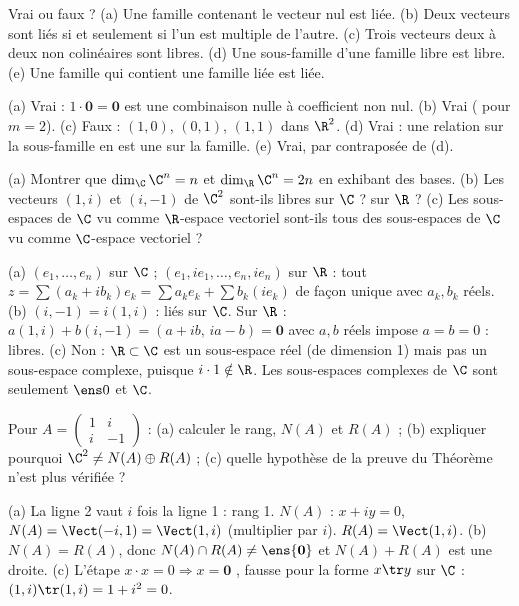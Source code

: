 \begin{exo}
Vrai ou faux ? (a) Une famille contenant le vecteur nul est liée. (b) Deux vecteurs sont liés si et seulement si l'un est multiple de l'autre. (c) Trois vecteurs deux à deux non colinéaires sont libres. (d) Une sous-famille d'une famille libre est libre. (e) Une famille qui contient une famille liée est liée.
\begin{corrige}
(a) Vrai : $1\cdot\mathbf 0=\mathbf 0$ est une combinaison nulle à coefficient non nul. (b) Vrai ( pour $m=2$). (c) Faux : $(1,0)$, $(0,1)$, $(1,1)$ dans $\R^2$. (d) Vrai : une relation sur la sous-famille en est une sur la famille. (e) Vrai, par contraposée de (d).
\end{corrige}
\end{exo}
\begin{exo}
(a) Montrer que $\dim_{\C}\C^n=n$ et $\dim_{\R}\C^n=2n$ en exhibant des bases. (b) Les vecteurs $(1,i)$ et $(i,-1)$ de $\C^2$ sont-ils libres sur $\C$ ? sur $\R$ ? (c) Les sous-espaces de $\C$ vu comme $\R$-espace vectoriel sont-ils tous des sous-espaces de $\C$ vu comme $\C$-espace vectoriel ?
\begin{corrige}
(a) $(e_1,\dots,e_n)$ sur $\C$ ; $(e_1,ie_1,\dots,e_n,ie_n)$ sur $\R$ : tout $z=\sum(a_k+ib_k)e_k=\sum a_ke_k+\sum b_k(ie_k)$ de façon unique avec $a_k,b_k$ réels. (b) $(i,-1)=i(1,i)$ : liés sur $\C$. Sur $\R$ : $a(1,i)+b(i,-1)=(a+ib,\,ia-b)=\mathbf 0$ avec $a,b$ réels impose $a=b=0$ : libres. (c) Non : $\R\subset\C$ est un sous-espace réel (de dimension 1) mais pas un sous-espace complexe, puisque $i\cdot1\notin\R$. Les sous-espaces complexes de $\C$ sont seulement $\ens0$ et $\C$.
\end{corrige}
\end{exo}
\begin{exo}
Pour $A=\begin{pmatrix}1&i\\i&-1\end{pmatrix}$ : (a) calculer le rang, $N(A)$ et $R(A)$ ; (b) expliquer pourquoi $\C^2\neq N(A)\oplus R(A)$ ; (c) quelle hypothèse de la preuve du Théorème  n'est plus vérifiée ?
\begin{corrige}
(a) La ligne 2 vaut $i$ fois la ligne 1 : rang 1. $N(A)$ : $x+iy=0$, $N(A)=\Vect(-i,1)=\Vect(1,i)$ (multiplier par $i$). $R(A)=\Vect(1,i)$. (b) $N(A)=R(A)$, donc $N(A)\cap R(A)\neq\ens{\mathbf 0}$ et $N(A)+R(A)$ est une droite. (c) L'étape \og $x\cdot x=0\Rightarrow x=\mathbf 0$ \fg, fausse pour la forme $x\tr y$ sur $\C$ : $(1,i)\tr(1,i)=1+i^2=0$.
\end{corrige}
\end{exo}
